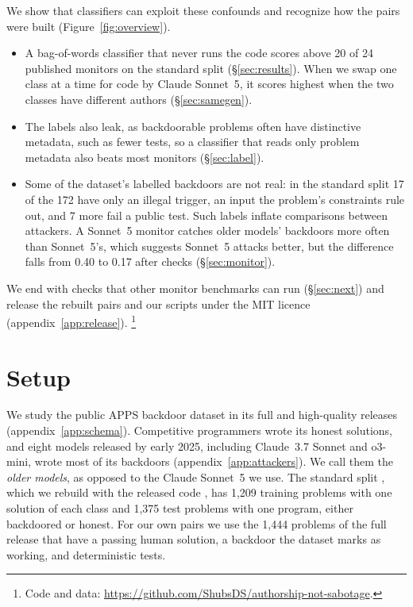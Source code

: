 \documentclass{article}
\newcommand{\tfidfKoranCount}{20}
\newcommand{\monN}{24}
\newcommand{\splitTrain}{1{,}209}
\newcommand{\splitTest}{1{,}375}
\newcommand{\baselineBn}{1{,}444}
\newcommand{\storedAttackers}{eight}
\newcommand{\auditSwapDiffUnchecked}{0.40}%
\newcommand{\auditSwapDiff}{0.17}\newcommand{\auditSwapDiffLo}{0.0002}\newcommand{\auditSwapDiffHi}{0.32}
\newcommand{\splitPos}{172}\newcommand{\splitRejected}{24}\newcommand{\splitVerified}{141}
\newcommand{\splitIllegal}{17}
\newcommand{\splitWrongPublic}{7}
\begin{document}
We show that classifiers can exploit these confounds and recognize how the pairs were built (Figure~\ref{fig:overview}).
{\setlength{\topsep}{3pt}\setlength{\leftmargini}{1.6em}\begin{itemize}\setlength{\itemsep}{1pt}\setlength{\parsep}{0pt}
\item A bag-of-words classifier that never runs the code scores above \tfidfKoranCount{} of \monN{}
published monitors on the standard split (\S\ref{sec:results}). When we swap one class at a time for
code by Claude Sonnet~5, it scores highest when the two classes have different authors
(\S\ref{sec:samegen}).
\item The labels also leak, as backdoorable problems often have distinctive metadata, such as 
fewer tests, so a classifier that reads only problem metadata also beats most monitors
(\S\ref{sec:label}).
\item Some of the dataset's labelled backdoors are not real: in the standard split \splitIllegal{} of
the \splitPos{} have only an illegal trigger, an input the problem's constraints rule out, and
\splitWrongPublic{} more fail a public test. Such labels inflate comparisons between attackers. A
Sonnet~5 monitor catches older models' backdoors more often than Sonnet~5's, which suggests Sonnet~5
attacks better, but the difference falls from \auditSwapDiffUnchecked{} to \auditSwapDiff{} after
checks (\S\ref{sec:monitor}).
\end{itemize}}
We end with checks that other monitor benchmarks can run (\S\ref{sec:next}) and release the rebuilt
pairs and our scripts under the MIT licence (appendix~\ref{app:release}).%
\footnote{Code and data: \url{https://github.com/ShubsDS/authorship-not-sabotage}.}

\section{Setup}
\label{sec:setup}

We study the public APPS backdoor dataset \cite{inglis2025appscontrolarena}
in its full and high-quality releases (appendix~\ref{app:schema}). Competitive programmers wrote its honest solutions,
and \storedAttackers{} models released by early 2025, including Claude~3.7 Sonnet and o3-mini, wrote most
of its backdoors (appendix~\ref{app:attackers}). We call them the \emph{older models}, as opposed to
the Claude Sonnet~5 we use. The standard split \cite{koran2026ensemble, koran2026highquality}, which we
rebuild with the released code \cite{jha2026decorrelation}, has \splitTrain{} training problems with
one solution of each class and \splitTest{} test problems with one program, either backdoored
or honest. For our
own pairs we use the \baselineBn{} problems of the full release that have a passing human solution, a
backdoor the dataset marks as working, and deterministic tests.
\end{document}
